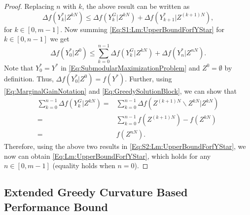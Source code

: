 \documentclass[letterpaper, 10 pt, conference]{ieeeconf}
\begin{document}
{\begin{proof}
Replacing $n$ with $k$, the above result can be written as 
\begin{equation}\label{Eq:S1:Lm:UpperBoundForfYStar}
    \Delta f(Y^*_k\vert Z^{kN}) \leq \Delta f(Y^G_k\vert Z^{kN}) + \Delta f(Y^*_{k+1}\vert Z^{(k+1)N}),
\end{equation}
for $k\in[0,m-1]$. Now summing \eqref{Eq:S1:Lm:UpperBoundForfYStar} for $k\in[0,n-1]$ we get
\begin{equation}\label{Eq:S2:Lm:UpperBoundForfYStar}
    \Delta f(Y^*_0\vert Z^0) \leq \sum_{k=0}^{n-1} \Delta f(Y^G_k\vert Z^{kN}) + \Delta f(Y^*_{n}\vert Z^{nN}).
\end{equation}
Note that $Y^*_0 = Y^*$ in \eqref{Eq:SubmodularMaximizationProblem} and $Z^0=\emptyset$ by definition. Thus, $\Delta f(Y^*_0\vert Z^0) = f(Y^*)$. Further, using \eqref{Eq:MarginalGainNotation} and \eqref{Eq:GreedySolutionBlock}, we can show that 
\begin{align}
    \sum_{k=0}^{n-1} \Delta f(Y^G_k\vert Z^{kN}) 
    =& \sum_{k=0}^{n-1} \Delta f( Z^{(k+1)N} \backslash Z^{kN} \vert Z^{kN})\nonumber \\
    =& \sum_{k=0}^{n-1} f(Z^{(k+1)N}) - f(Z^{kN}) \nonumber \\
    =& f(Z^{nN}).\nonumber 
\end{align}
Therefore, using the above two results in  \eqref{Eq:S2:Lm:UpperBoundForfYStar}, we now can obtain \eqref{Eq:Lm:UpperBoundForfYStar}, which holds for any $n\in[0,m-1]$ (equality holds when $n=0$). 
\end{proof}


\subsection{Extended Greedy Curvature Based Performance Bound}

}
\end{document}
